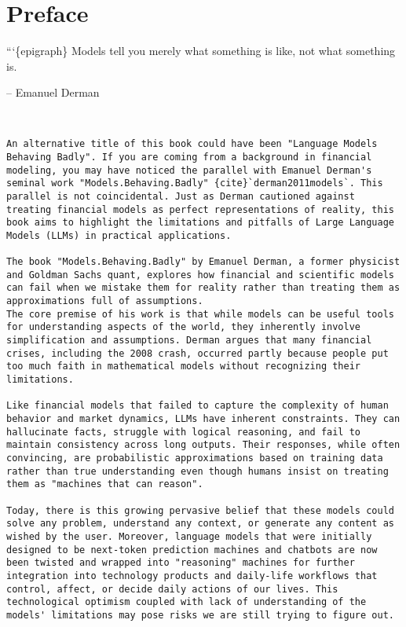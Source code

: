 \hypertarget{preface}{%
\section{Preface}\label{preface}}

```\{epigraph\} Models tell you merely what something is like, not what
something is.

-- Emanuel Derman

\begin{verbatim}


An alternative title of this book could have been "Language Models Behaving Badly". If you are coming from a background in financial modeling, you may have noticed the parallel with Emanuel Derman's seminal work "Models.Behaving.Badly" {cite}`derman2011models`. This parallel is not coincidental. Just as Derman cautioned against treating financial models as perfect representations of reality, this book aims to highlight the limitations and pitfalls of Large Language Models (LLMs) in practical applications.

The book "Models.Behaving.Badly" by Emanuel Derman, a former physicist and Goldman Sachs quant, explores how financial and scientific models can fail when we mistake them for reality rather than treating them as approximations full of assumptions.
The core premise of his work is that while models can be useful tools for understanding aspects of the world, they inherently involve simplification and assumptions. Derman argues that many financial crises, including the 2008 crash, occurred partly because people put too much faith in mathematical models without recognizing their limitations.

Like financial models that failed to capture the complexity of human behavior and market dynamics, LLMs have inherent constraints. They can hallucinate facts, struggle with logical reasoning, and fail to maintain consistency across long outputs. Their responses, while often convincing, are probabilistic approximations based on training data rather than true understanding even though humans insist on treating them as "machines that can reason".

Today, there is this growing pervasive belief that these models could solve any problem, understand any context, or generate any content as wished by the user. Moreover, language models that were initially designed to be next-token prediction machines and chatbots are now been twisted and wrapped into "reasoning" machines for further integration into technology products and daily-life workflows that control, affect, or decide daily actions of our lives. This technological optimism coupled with lack of understanding of the models' limitations may pose risks we are still trying to figure out.


\end{verbatim}
